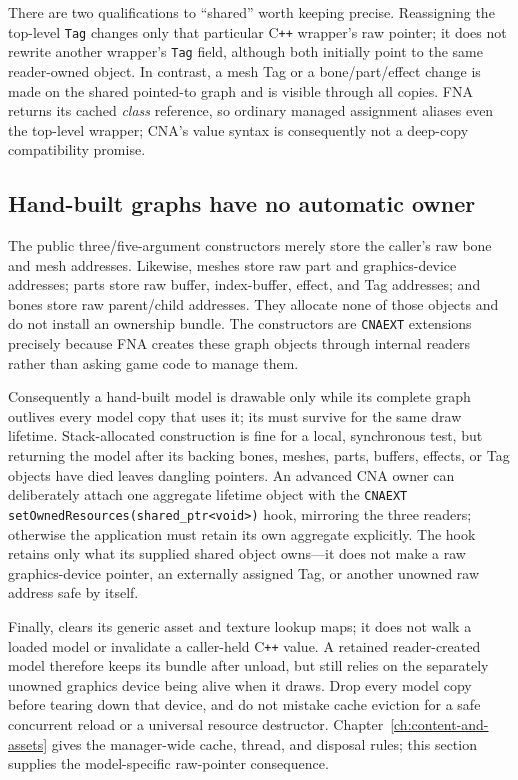 There are two qualifications to ``shared'' worth keeping precise. Reassigning the top-level
\texttt{Tag} changes only that particular C\texttt{++} wrapper's raw pointer; it does not rewrite
another wrapper's \texttt{Tag} field, although both initially point to the same reader-owned
object. In contrast, a mesh Tag or a bone/part/effect change is made on the shared pointed-to
graph and is visible through all copies. FNA returns its cached  \emph{class}
reference, so ordinary managed assignment aliases even the top-level wrapper; CNA's value syntax
is consequently not a deep-copy compatibility promise.

\subsection{Hand-built graphs have no automatic owner}

The public three/five-argument  constructors merely store the caller's raw
bone and mesh addresses. Likewise, meshes store raw part and graphics-device addresses; parts
store raw buffer, index-buffer, effect, and Tag addresses; and bones store raw parent/child
addresses. They allocate none of those objects and do not install an ownership bundle. The
constructors are \texttt{CNAEXT} extensions precisely because FNA creates these graph objects
through internal readers rather than asking game code to manage them.

Consequently a hand-built model is drawable only while its complete graph outlives every model
copy that uses it; its  must survive for the same draw lifetime.
Stack-allocated construction is fine for a local, synchronous test, but returning the model
after its backing bones, meshes, parts, buffers, effects, or Tag objects have died leaves
dangling pointers. An advanced CNA owner can deliberately attach one aggregate lifetime object
with the \texttt{CNAEXT}
\texttt{setOwnedResources(shared\_ptr<void>)} hook, mirroring the three readers; otherwise the
application must retain its own aggregate explicitly. The hook retains only what its supplied
shared object owns---it does not make a raw graphics-device pointer, an externally assigned Tag,
or another unowned raw address safe by itself.

Finally,  clears its generic asset and texture lookup maps;
it does not walk a loaded model or invalidate a caller-held C\texttt{++} value. A retained
reader-created model therefore keeps its bundle after unload, but still relies on the separately
unowned graphics device being alive when it draws. Drop every model copy before tearing down that
device, and do not mistake cache eviction for a safe concurrent reload or a universal resource
destructor. Chapter~\ref{ch:content-and-assets} gives the manager-wide cache, thread, and
disposal rules; this section supplies the model-specific raw-pointer consequence.

